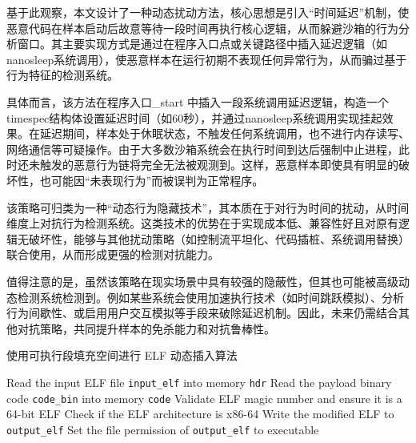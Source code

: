 基于此观察，本文设计了一种动态扰动方法，核心思想是引入“时间延迟”机制，使恶意代码在样本启动后故意等待一段时间再执行核心逻辑，从而躲避沙箱的行为分析窗口。其主要实现方式是通过在程序入口点或关键路径中插入延迟逻辑（如 nanosleep系统调用），使恶意样本在运行初期不表现任何异常行为，从而骗过基于行为特征的检测系统。

具体而言，该方法在程序入口\_start 中插入一段系统调用延迟逻辑，构造一个 timespec结构体设置延迟时间（如60秒），并通过nanosleep系统调用实现挂起效果。在延迟期间，样本处于休眠状态，不触发任何系统调用，也不进行内存读写、网络通信等可疑操作。由于大多数沙箱系统会在执行时间到达后强制中止进程，此时还未触发的恶意行为链将完全无法被观测到。这样，恶意样本即使具有明显的破坏性，也可能因“未表现行为”而被误判为正常程序。

该策略可归类为一种“动态行为隐藏技术”，其本质在于对行为时间的扰动，从时间维度上对抗行为检测系统。这类技术的优势在于实现成本低、兼容性好且对原有逻辑无破坏性，能够与其他扰动策略（如控制流平坦化、代码插桩、系统调用替换）联合使用，从而形成更强的检测对抗能力。

值得注意的是，虽然该策略在现实场景中具有较强的隐蔽性，但其也可能被高级动态检测系统检测到。例如某些系统会使用加速执行技术（如时间跳跃模拟）、分析行为间歇性、或启用用户交互模拟等手段来破除延迟机制。因此，未来仍需结合其他对抗策略，共同提升样本的免杀能力和对抗鲁棒性。
\begin{algorithm}[htbp]
	\caption{使用可执行段填充空间进行 ELF 动态插入算法}
	Read the input ELF file \texttt{input\_elf} into memory \texttt{hdr}\;
	Read the payload binary code \texttt{code\_bin} into memory \texttt{code}\;
	Validate ELF magic number and ensure it is a 64-bit ELF\;
	Check if the ELF architecture is x86-64\;
	Write the modified ELF to \texttt{output\_elf}\;
	Set the file permission of \texttt{output\_elf} to executable\;
\end{algorithm}

